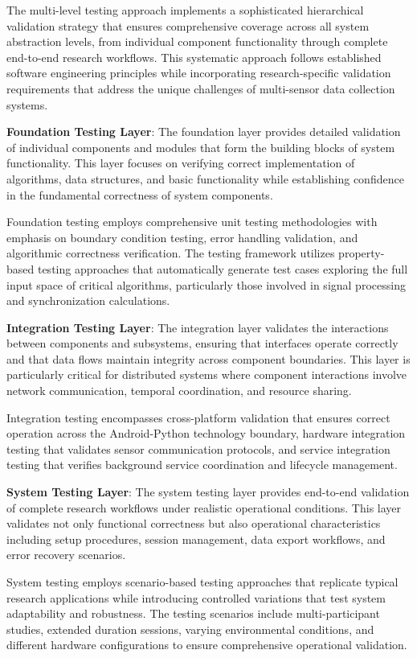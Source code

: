 \documentclass[12pt,a4paper]{article}
\begin{document}
The multi-level testing approach implements a sophisticated hierarchical validation strategy that ensures comprehensive
coverage across all system abstraction levels, from individual component functionality through complete end-to-end
research workflows. This systematic approach follows established software engineering principles while incorporating
research-specific validation requirements that address the unique challenges of multi-sensor data collection systems.

\textbf{Foundation Testing Layer}: The foundation layer provides detailed validation of individual components and modules
that form the building blocks of system functionality. This layer focuses on verifying correct implementation of
algorithms, data structures, and basic functionality while establishing confidence in the fundamental correctness of
system components.

Foundation testing employs comprehensive unit testing methodologies with emphasis on boundary condition testing, error
handling validation, and algorithmic correctness verification. The testing framework utilizes property-based testing
approaches that automatically generate test cases exploring the full input space of critical algorithms, particularly
those involved in signal processing and synchronization calculations.

\textbf{Integration Testing Layer}: The integration layer validates the interactions between components and subsystems,
ensuring that interfaces operate correctly and that data flows maintain integrity across component boundaries. This
layer is particularly critical for distributed systems where component interactions involve network communication,
temporal coordination, and resource sharing.

Integration testing encompasses cross-platform validation that ensures correct operation across the Android-Python
technology boundary, hardware integration testing that validates sensor communication protocols, and service integration
testing that verifies background service coordination and lifecycle management.

\textbf{System Testing Layer}: The system testing layer provides end-to-end validation of complete research workflows under
realistic operational conditions. This layer validates not only functional correctness but also operational
characteristics including setup procedures, session management, data export workflows, and error recovery scenarios.

System testing employs scenario-based testing approaches that replicate typical research applications while introducing
controlled variations that test system adaptability and robustness. The testing scenarios include multi-participant
studies, extended duration sessions, varying environmental conditions, and different hardware configurations to ensure
comprehensive operational validation.
\end{document}
